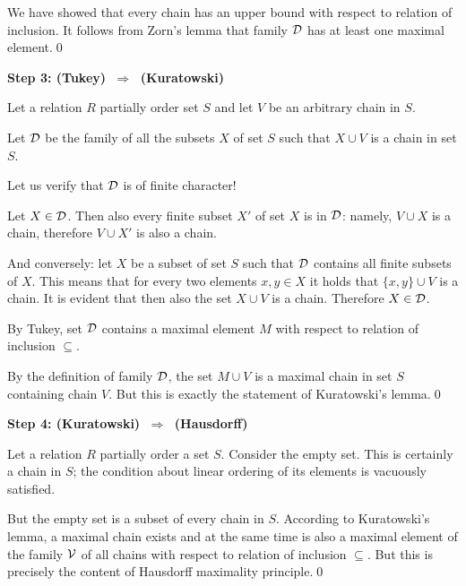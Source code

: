 \documentclass[11pt,paper=b5,footinclude,headinclude]{scrbook} %
\def\sledi {{~\Rightarrow~}}
\theoremstyle{remark}
\theoremstyle{definition} %
\theoremstyle{theorem} %
\begin{document}
We have showed that every chain has an upper bound with respect to relation of inclusion.
It follows from Zorn's lemma that family ${\cal D}$ has at least one maximal element.\qed

\bigskip
\textbf{ Step 3: (Tukey) $\sledi$ (Kuratowski)}

Let a relation $R$ partially order set $S$ and let $V$ be an arbitrary chain in $S$.

Let ${\cal D}$ be the family of all the subsets $X$ of set $S$ such that
$X\cup V$ is a chain in set $S$.

Let us verify that ${\cal D}$ is of finite character!

Let $X\in {\cal D}$. Then also every finite subset $X'$ of set $X$ is in ${\cal D}$:
namely, $V\cup X$ is a chain, therefore $V\cup X'$ is also a chain.

And conversely: let $X$ be a subset of set $S$ such that ${\cal D}$ contains all finite subsets of $X$.
This means that for every two elements $x,y\in X$ it holds that
$\{x,y\}\cup V$ is a chain. It is evident that then also the set $X\cup V$ is a chain. Therefore $X\in {\cal D}$.

By Tukey, set ${\cal D}$ contains a maximal element $M$ with respect to relation of inclusion $\subseteq$.

By the definition of family ${\cal D}$, the set $M\cup V$ is a maximal chain in set $S$ containing chain $V$.
But this is exactly the statement of Kuratowski's lemma.\qed

\bigskip
\textbf{ Step 4: (Kuratowski) $\sledi$ (Hausdorff)}

Let a relation $R$ partially order a set $S$.
Consider the empty set. This is certainly a chain in $S$; the condition about linear ordering of its elements is vacuously satisfied.

But the empty set is a subset of every chain in $S$. According to Kuratowski's lemma, a maximal chain exists and
at the same time is also a maximal element of the family ${\cal V}$ of all chains with respect to relation of inclusion $\subseteq$.
But this is precisely the content of Hausdorff maximality principle.\qed

%
%
\bigskip
\end{document}
